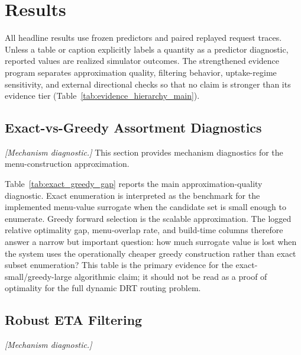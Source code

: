 \section{Results}
\label{sec:results}

All headline results use frozen predictors and paired replayed request traces. Unless a table or caption explicitly labels a quantity as a predictor diagnostic, reported values are realized simulator outcomes. The strengthened evidence program separates approximation quality, filtering behavior, uptake-regime sensitivity, and external directional checks so that no claim is stronger than its evidence tier (Table~\ref{tab:evidence_hierarchy_main}).

\subsection{Exact-vs-Greedy Assortment Diagnostics}
\label{sec:exact_greedy}

\textit{[Mechanism diagnostic.]} This section provides mechanism diagnostics for the menu-construction approximation.


Table~\ref{tab:exact_greedy_gap} reports the main approximation-quality diagnostic. Exact enumeration is interpreted as the benchmark for the implemented menu-value surrogate when the candidate set is small enough to enumerate. Greedy forward selection is the scalable approximation. The logged relative optimality gap, menu-overlap rate, and build-time columns therefore answer a narrow but important question: how much surrogate value is lost when the system uses the operationally cheaper greedy construction rather than exact subset enumeration? This table is the primary evidence for the exact-small/greedy-large algorithmic claim; it should not be read as a proof of optimality for the full dynamic DRT routing problem.

\subsection{Robust ETA Filtering}
\label{sec:robust_filtering}

\textit{[Mechanism diagnostic.]}


